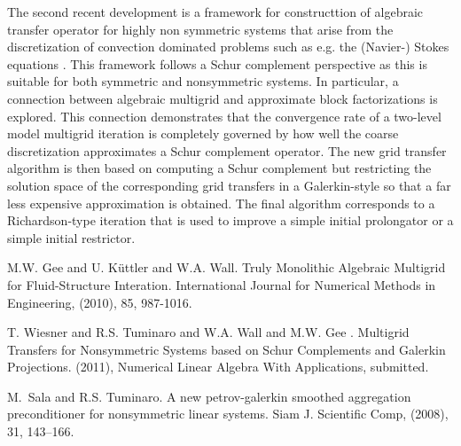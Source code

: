 The second recent development is a framework for constructtion of algebraic transfer operator for highly non symmetric systems that arise from the discretization of convection dominated problems such as e.g. the (Navier-) Stokes equations \cite{wiesnertuminarogee}.
This framework follows a Schur complement perspective as this is suitable for 
both symmetric and nonsymmetric systems.  In particular, a connection between 
algebraic multigrid and approximate block factorizations is explored. This 
connection demonstrates that the convergence rate of a two-level model 
multigrid iteration is completely governed by how well the coarse 
discretization approximates a Schur complement operator. The new grid 
transfer algorithm is then based on computing a Schur complement but
restricting the solution space of the corresponding grid transfers
in a Galerkin-style so that a far less
expensive approximation
is obtained. The final
algorithm corresponds to a Richardson-type iteration that is used to 
improve a simple initial prolongator or a simple initial restrictor. 


\begin{thebibliography}{10}

{\sc M.W. Gee and U. K\"uttler and W.A. Wall}. {Truly Monolithic Algebraic Multigrid for Fluid-Structure Interation}. International Journal for Numerical Methods in Engineering, (2010), 85, 987-1016.



{\sc T. Wiesner and R.S. Tuminaro and W.A. Wall and M.W. Gee }. {Multigrid Transfers for Nonsymmetric Systems based on Schur Complements and Galerkin Projections}. (2011), Numerical Linear Algebra With Applications, submitted.



{\sc M.~Sala and R.S. Tuminaro}. {A new petrov-galerkin smoothed aggregation preconditioner for   nonsymmetric linear systems}. Siam J. Scientific Comp, (2008), 31, 143--166.

\end{thebibliography}
